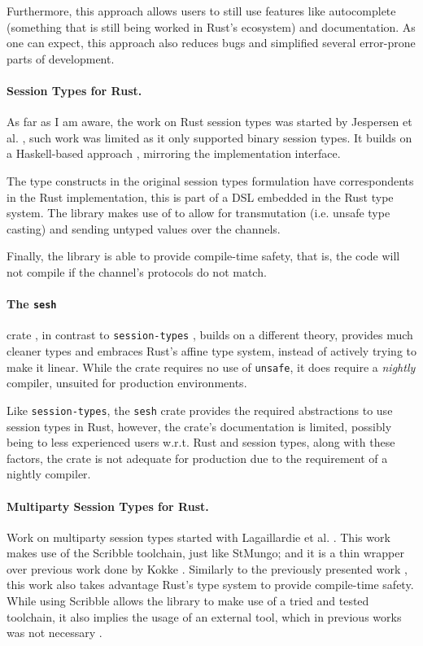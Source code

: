 Furthermore, this approach allows users to still use features like autocomplete
(something that is still being worked in Rust's ecosystem) and documentation.
As one can expect, this approach also reduces bugs and simplified several error-prone parts of development.

\paragraph{Session Types for Rust.}
As far as I am aware, the work on Rust session types was started by Jespersen et al. \autocite{Jespersen2015},
such work was limited as it only supported binary session types.
It builds on a Haskell-based approach \autocite{Pucella2008}, mirroring the implementation interface.

The type constructs in the original session types formulation have correspondents in the Rust implementation,
this is part of a DSL embedded in the Rust type system.
The library makes use of  to allow for transmutation (i.e. unsafe type casting)
and sending untyped values over the channels.

Finally, the library is able to provide compile-time safety, that is,
the code will not compile if the channel's protocols do not match.

\paragraph{The \texttt{sesh}} crate \cite{Kokke2019}, in contrast to \texttt{session-types} \autocite{Jespersen2015},
builds on a different theory, provides much cleaner types and embraces Rust's affine type system,
instead of actively trying to make it linear.
While the crate requires no use of \texttt{unsafe}, it does require a \emph{nightly} compiler,
unsuited for production environments.

Like \texttt{session-types}, the \texttt{sesh} crate provides the required abstractions to use session types in Rust,
however, the crate's documentation is limited, possibly being  to less experienced users
w.r.t. Rust and session types, along with these factors,
the crate is not adequate for production due to the requirement of a nightly compiler.

\paragraph{Multiparty Session Types for Rust.}
Work on multiparty session types started with Lagaillardie et al. \autocite{Lagaillardie2020}.
This work makes use of the Scribble \autocite{Yoshida2014} toolchain, just like StMungo;
and it is a thin wrapper over previous work done by Kokke \autocite{Kokke2019}.
Similarly to the previously presented work \autocite{Jespersen2015},
this work also takes advantage Rust's type system to provide compile-time safety.
While using Scribble allows the library to make use of a tried and tested toolchain,
it also implies the usage of an external tool, which in previous works was not necessary \autocite{Jespersen2015, Kokke2019}.

